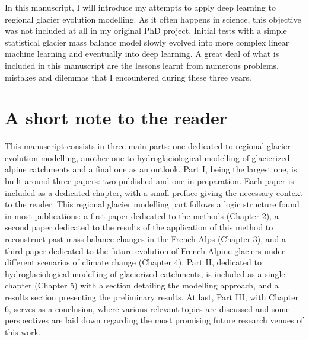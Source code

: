 In this manuscript, I will introduce my attempts to apply deep learning to regional glacier evolution modelling. As it often happens in science, this objective was not included at all in my original PhD project. Initial tests with a simple statistical glacier mass balance model slowly evolved into more complex linear machine learning and eventually into deep learning. A great deal of what is included in this manuscript are the lessons learnt from numerous problems, mistakes and dilemmas that I encountered during these three years. 

\section{A short note to the reader}

This manuscript consists in three main parts: one dedicated to regional glacier evolution modelling, another one to hydroglaciological modelling of glacierized  alpine catchments and a final one as an outlook. Part I, being the largest one, is built around three papers: two published and one in preparation. Each paper is included as a dedicated chapter, with a small preface giving the necessary context to the reader. This regional glacier modelling part follows a logic structure found in most publications: a first paper dedicated to the methods (Chapter 2), a second paper dedicated to the results of the application of this method to reconstruct past mass balance changes in the French Alps (Chapter 3), and a third paper dedicated to the future evolution of French Alpine glaciers under different scenarios of climate change (Chapter 4). Part II, dedicated to hydroglaciological modelling of glacierized catchments, is included as a single chapter (Chapter 5) with a section detailing the modelling approach, and a results section presenting the preliminary results. At last, Part III, with Chapter 6, serves as a conclusion, where various relevant topics are discussed and some perspectives are laid down regarding the most promising future research venues of this work.